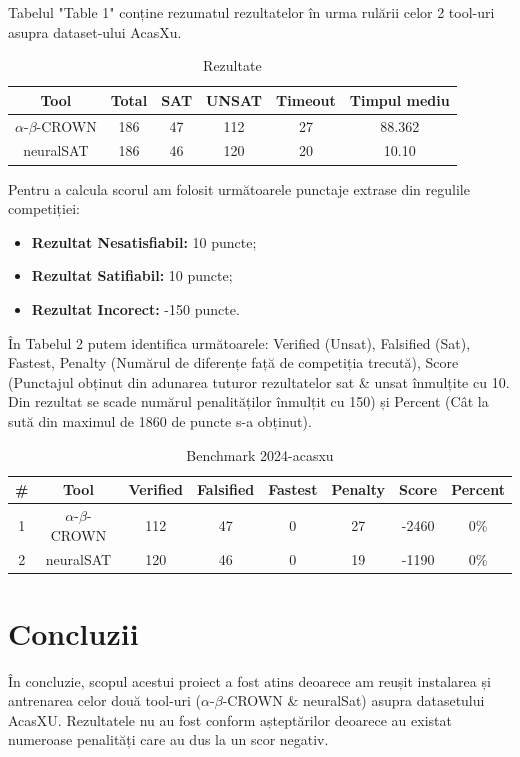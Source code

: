 \documentclass[12pt,a4paper]{article}
\theoremstyle{definition}
\theoremstyle{remark}
\begin{document}
Tabelul "Table 1" conține rezumatul rezultatelor în urma rulării celor 2 tool-uri asupra dataset-ului AcasXu.\par
    \begin{table}[h]
    \centering
    \begin{tabular}{cccccc}
        \toprule
        \textbf{Tool} & \textbf{Total} & \textbf{SAT} & \textbf{UNSAT} & \textbf{Timeout} & \textbf{Timpul mediu}\\ 
        \midrule
        $\alpha$-$\beta$-CROWN & 186 & 47 & 112 & 27 & 88.362\\
        neuralSAT & 186 & 46 & 120 & 20 & 10.10\\
        \bottomrule
    \end{tabular}
    \caption{Rezultate}
    \label{tab:a}
\end{table}
Pentru a calcula scorul am folosit următoarele punctaje extrase din regulile competiției:
\begin{itemize}
  \item \textbf{Rezultat Nesatisfiabil:} 10 puncte;
  \item \textbf{Rezultat Satifiabil:} 10 puncte;
  \item \textbf{Rezultat Incorect:} -150 puncte.
\end{itemize}
În Tabelul 2 putem identifica următoarele: Verified (Unsat), Falsified (Sat), Fastest, Penalty (Numărul de diferențe față de competiția trecută), Score (Punctajul obținut din adunarea tuturor rezultatelor sat \& unsat înmulțite cu 10. Din rezultat se scade numărul penalităților înmulțit cu 150) și Percent (Cât la sută din maximul de 1860 de puncte s-a obținut).
    \begin{table}[h]
    \centering
    \begin{tabular}{cccccccc}
        \toprule
        \textbf{\#} &\textbf{Tool} & \textbf{Verified} & \textbf{Falsified} & \textbf{Fastest} & \textbf{Penalty} & \textbf{Score} & \textbf{Percent}\\ 
        \midrule
        1 & $\alpha$-$\beta$-CROWN & 112 & 47 & 0 & 27 & -2460 & 0\%\\
        2 & neuralSAT & 120 & 46 & 0 & 19 & -1190 & 0\%\\
        \bottomrule
    \end{tabular}
    \caption{Benchmark 2024-acasxu}
    \label{tab:a}
\end{table}
\section{Concluzii}
În concluzie, scopul acestui proiect a fost atins deoarece am reușit instalarea și antrenarea celor două tool-uri ($\alpha$-$\beta$-CROWN \& neuralSat) asupra datasetului AcasXU. Rezultatele nu au fost conform așteptărilor deoarece au existat numeroase penalități care au dus la un scor negativ.


\newpage


\end{document}
